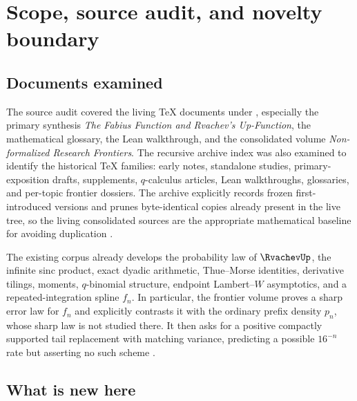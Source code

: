 \documentclass[11pt,oneside]{article}
\numberwithin{equation}{section}
\theoremstyle{definition}
\theoremstyle{remark}
\begin{document}
\tableofcontents
\newpage

\section{Scope, source audit, and novelty boundary}
\label{p3:sec:scope}

\subsection{Documents examined}

The source audit covered the living TeX documents under
, especially the primary synthesis
\emph{The Fabius Function and Rvachev's Up-Function}, the mathematical glossary,
the Lean walkthrough, and the consolidated volume
\emph{Non-formalized Research Frontiers}.  The recursive archive index was also
examined to identify the historical TeX families: early notes, standalone studies,
primary-exposition drafts, supplements, $q$-calculus articles, Lean walkthroughs,
glossaries, and per-topic frontier dossiers.  The archive explicitly records frozen
first-introduced versions and prunes byte-identical copies already present in the live
tree, so the living consolidated sources are the appropriate mathematical baseline
for avoiding duplication \cite{p3:proveit-primary,p3:proveit-frontiers,p3:proveit-archive}.

The existing corpus already develops the probability law of $\RvachevUp$, the infinite sinc
product, exact dyadic arithmetic, Thue--Morse identities, derivative tilings, moments,
$q$-binomial structure, endpoint Lambert--$W$ asymptotics, and a repeated-integration
spline $f_n$.  In particular, the frontier volume proves a sharp error law for $f_n$
and explicitly contrasts it with the ordinary prefix density $p_n$, whose sharp law is
not studied there.  It then asks for a positive compactly supported tail replacement
with matching variance, predicting a possible $16^{-n}$ rate but asserting no such
scheme \cite{p3:proveit-frontiers}.

\subsection{What is new here}
\end{document}

